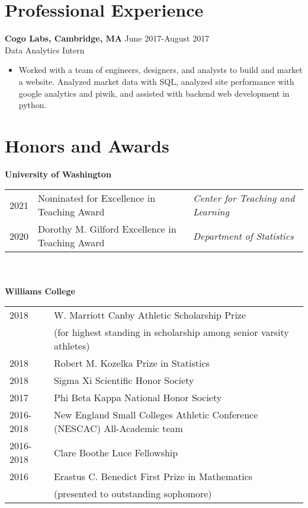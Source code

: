 \documentclass[margin, 10pt]{res} %
\begin{document}
\begin{resume}
{\section{Professional Experience}
{\textbf{Cogo Labs, Cambridge, MA}} \hfill June 2017-August 2017 \\
Data Analytics Intern
\begin{itemize}
\item Worked with a team of engineers, designers, and analysts to build and market a website. Analyzed market data with SQL, analyzed site performance with google analytics and piwik, and assisted with backend web development in python. 
\end{itemize}



\section{Honors and Awards}
\textbf{University of Washington} \\
\begin{tabular}{l l l}
2021 & Nominated for Excellence in Teaching Award & \emph{Center for Teaching and Learning} \\
2020 & Dorothy M. Gilford Excellence in Teaching Award & \emph{Department of Statistics}
\end{tabular}  \\
\\
\textbf{Williams College} \\
\begin{tabular}{l l }
2018 & W. Marriott Canby Athletic Scholarship Prize   \\
& (for highest standing in scholarship among senior varsity athletes) \\
2018 & Robert M. Kozelka Prize in Statistics   \\
2018&  Sigma Xi Scientific Honor Society \\
2017 & Phi Beta Kappa  National Honor Society \\
2016-2018 & New England Small Colleges Athletic Conference (NESCAC) All-Academic team \\
2016-2018 & Clare Boothe Luce Fellowship \\
2016 & Erastus C. Benedict First Prize in Mathematics \\
& (presented to outstanding sophomore) \\
\end{tabular}

}
\end{resume}
\end{document}
